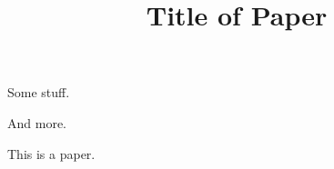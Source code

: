 \documentclass[12pt,letterpaper]{article}
\title{Title of Paper}
\begin{document}
Some stuff. \cite[70]{morrison02aa}

And more. \cite{slinger07aa}

This is a paper. \cite{public99ac}
\end{document}
